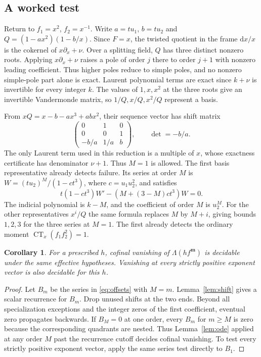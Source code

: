 \documentclass[11pt]{article}
\newtheorem{corollary}[theorem]{Corollary}
\DeclareMathOperator{\CT}{CT}
\newcommand{\dd}{\mathrm d}
\begin{document}
\subsection*{A worked test}
Return to \(f_1=x^2\), \(f_2=x^{-1}\). Write \(a=tu_1\),
\(b=tu_2\) and \(Q=(1-a x^2)(1-b/x)\).
Since \(F=x\), the twisted quotient in the frame \(\dd x/x\)
is the cokernel of \(x\partial_x+\nu\).
Over a splitting field, \(Q\) has three distinct nonzero roots.
Applying \(x\partial_x+\nu\) raises a pole of order \(j\) there
to order \(j+1\) with nonzero leading coefficient.
Thus higher poles reduce to simple poles, and no nonzero
simple-pole part alone is exact. Laurent polynomial terms are
exact since \(k+\nu\) is invertible for every integer \(k\).
The values of \(1,x,x^2\) at the three roots give an invertible
Vandermonde matrix, so \(1/Q,x/Q,x^2/Q\) represent a basis.

From \(xQ=x-b-a x^3+abx^2\), their sequence vector has shift matrix
\[
       \begin{pmatrix}
           0&1&0\\
           0&0&1\\
           -b/a&1/a&b
         \end{pmatrix},
       \qquad \det=-b/a.
\]
The only Laurent term used in this reduction is a multiple of \(x\),
whose exactness certificate has denominator \(\nu+1\). Thus \(M=1\)
is allowed. The first basis representative already detects failure.
Its series at order \(M\) is \(W=(tu_2)^M/(1-ct^3)\), where
\(c=u_1u_2^2\), and satisfies
\[
            t(1-ct^3)W'-(M+(3-M)ct^3)W=0.
\]
The indicial polynomial is \(k-M\), and the coefficient of order
\(M\) is \(u_2^M\). For the other representatives \(x^i/Q\) the same
formula replaces \(M\) by \(M+i\), giving bounds \(1,2,3\) for the
three series at \(M=1\). The first already detects the ordinary
moment \(\CT_x(f_1 f_2^2)=1\).

\begin{corollary}\label{cor:fixed}
For a prescribed \(h\), cofinal vanishing of
\(\Lambda(hf^{\mathbf m})\) is decidable under the same effective
hypotheses. Vanishing at every strictly positive exponent vector
is also decidable for this \(h\).
\end{corollary}

\begin{proof}
Let \(B_m\) be the series in \eqref{eq:offsets} with \(M=m\).
Lemma~\ref{lem:shift} gives a scalar recurrence for \(B_m\).
Drop unused shifts at the two ends. Beyond all specialization
exceptions and the integer zeros of the first coefficient,
eventual zero propagates backwards. If \(B_M=0\) at one order,
every \(B_m\) for \(m\ge M\) is zero because the corresponding
quadrants are nested. Thus Lemma~\ref{lem:ode} applied at any order
\(M\) past the recurrence cutoff decides cofinal vanishing.
To test every strictly positive exponent vector, apply the same
series test directly to \(B_1\).
\end{proof}
\end{document}
